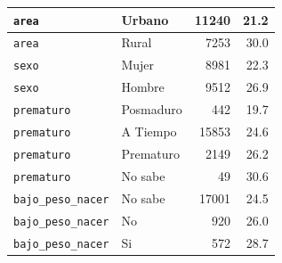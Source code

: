 \begin{longtable}{|p{4.4cm}|p{5.6cm}|r|r|}
    \texttt{area} & Urbano & 11240 & 21.2 \\ \hline
    \texttt{area} & Rural & 7253 & 30.0 \\ \hline
    \texttt{sexo} & Mujer & 8981 & 22.3 \\ \hline
    \texttt{sexo} & Hombre & 9512 & 26.9 \\ \hline
    \texttt{prematuro} & Posmaduro & 442 & 19.7 \\ \hline
    \texttt{prematuro} & A Tiempo & 15853 & 24.6 \\ \hline
    \texttt{prematuro} & Prematuro & 2149 & 26.2 \\ \hline
    \texttt{prematuro} & No sabe & 49 & 30.6 \\ \hline
    \texttt{bajo\_peso\_nacer} & No sabe & 17001 & 24.5 \\ \hline
    \texttt{bajo\_peso\_nacer} & No & 920 & 26.0 \\ \hline
    \texttt{bajo\_peso\_nacer} & Si & 572 & 28.7 \\ \hline
\end{longtable}
\endgroup
